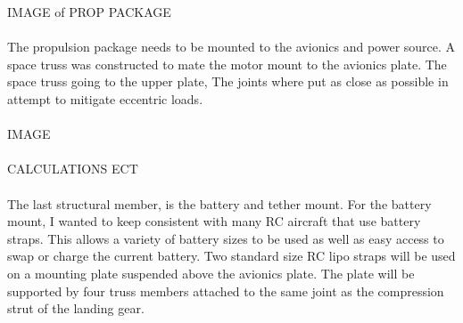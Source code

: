 \documentclass[12pt,letterpaper]{article}
\begin{document}
IMAGE of PROP PACKAGE\\\\


The propulsion package needs to be mounted to the avionics and power source. A space truss was constructed to mate the motor mount to the avionics plate. The space truss going to the upper plate, The joints where put as close as possible in attempt to mitigate eccentric loads. \\\\

IMAGE\\\\

CALCULATIONS ECT\\\\

The last structural member, is the battery and tether mount. For the battery mount, I wanted to keep consistent with many RC aircraft that use battery straps. This allows a variety of battery sizes to be used as well as easy access to swap or charge the current battery. Two standard size RC lipo straps will be used on a mounting plate suspended above the avionics plate. The plate will be supported by four truss members attached to the same joint as the compression strut of the landing gear. 
\end{document}

